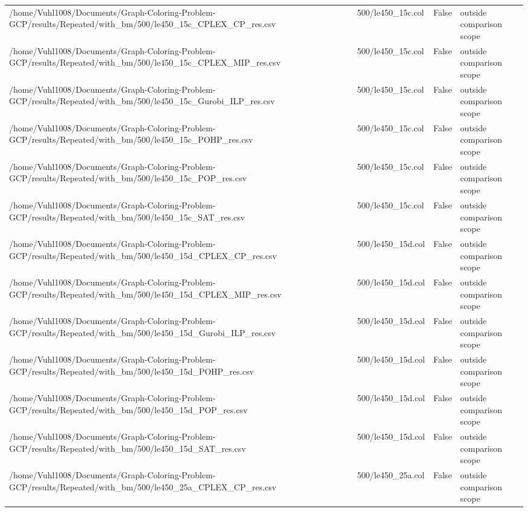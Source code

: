 \begin{table}[htbp]
\begin{tabular}{llll}
/home/Vuhl1008/Documents/Graph-Coloring-Problem-GCP/results/Repeated/with\_bm/500/le450\_15c\_CPLEX\_CP\_res.csv & 500/le450\_15c.col & False & outside comparison scope \\
/home/Vuhl1008/Documents/Graph-Coloring-Problem-GCP/results/Repeated/with\_bm/500/le450\_15c\_CPLEX\_MIP\_res.csv & 500/le450\_15c.col & False & outside comparison scope \\
/home/Vuhl1008/Documents/Graph-Coloring-Problem-GCP/results/Repeated/with\_bm/500/le450\_15c\_Gurobi\_ILP\_res.csv & 500/le450\_15c.col & False & outside comparison scope \\
/home/Vuhl1008/Documents/Graph-Coloring-Problem-GCP/results/Repeated/with\_bm/500/le450\_15c\_POHP\_res.csv & 500/le450\_15c.col & False & outside comparison scope \\
/home/Vuhl1008/Documents/Graph-Coloring-Problem-GCP/results/Repeated/with\_bm/500/le450\_15c\_POP\_res.csv & 500/le450\_15c.col & False & outside comparison scope \\
/home/Vuhl1008/Documents/Graph-Coloring-Problem-GCP/results/Repeated/with\_bm/500/le450\_15c\_SAT\_res.csv & 500/le450\_15c.col & False & outside comparison scope \\
/home/Vuhl1008/Documents/Graph-Coloring-Problem-GCP/results/Repeated/with\_bm/500/le450\_15d\_CPLEX\_CP\_res.csv & 500/le450\_15d.col & False & outside comparison scope \\
/home/Vuhl1008/Documents/Graph-Coloring-Problem-GCP/results/Repeated/with\_bm/500/le450\_15d\_CPLEX\_MIP\_res.csv & 500/le450\_15d.col & False & outside comparison scope \\
/home/Vuhl1008/Documents/Graph-Coloring-Problem-GCP/results/Repeated/with\_bm/500/le450\_15d\_Gurobi\_ILP\_res.csv & 500/le450\_15d.col & False & outside comparison scope \\
/home/Vuhl1008/Documents/Graph-Coloring-Problem-GCP/results/Repeated/with\_bm/500/le450\_15d\_POHP\_res.csv & 500/le450\_15d.col & False & outside comparison scope \\
/home/Vuhl1008/Documents/Graph-Coloring-Problem-GCP/results/Repeated/with\_bm/500/le450\_15d\_POP\_res.csv & 500/le450\_15d.col & False & outside comparison scope \\
/home/Vuhl1008/Documents/Graph-Coloring-Problem-GCP/results/Repeated/with\_bm/500/le450\_15d\_SAT\_res.csv & 500/le450\_15d.col & False & outside comparison scope \\
/home/Vuhl1008/Documents/Graph-Coloring-Problem-GCP/results/Repeated/with\_bm/500/le450\_25a\_CPLEX\_CP\_res.csv & 500/le450\_25a.col & False & outside comparison scope \\

\end{tabular}
\end{table}
